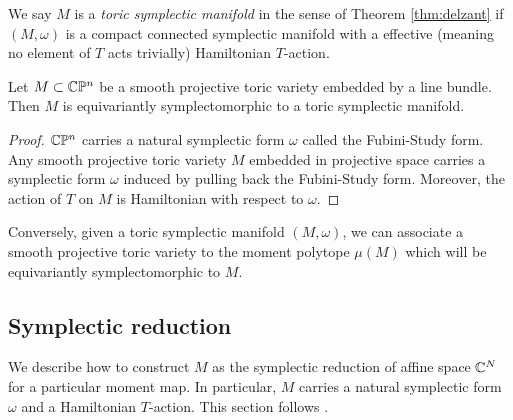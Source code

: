 We say $M$ is a \emph{toric symplectic manifold} in the sense of Theorem \ref{thm:delzant}
if $(M,\omega)$ is a compact connected symplectic manifold
with a effective (meaning no element of $T$ acts trivially) Hamiltonian $T$-action.

\begin{proposition}
    Let $M\subset \mathbb{C}\mathbb{P}^n$ be a smooth projective toric variety embedded by a line bundle.
    Then $M$ is equivariantly symplectomorphic to a toric symplectic manifold.
\end{proposition}
\begin{proof}
$\mathbb{C}\mathbb{P}^n$ carries a natural symplectic form $\omega$ 
called the Fubini-Study form. Any smooth projective toric variety $M$ embedded
in projective space carries a symplectic form $\omega$ induced by pulling 
back the Fubini-Study form. Moreover, the action of $T$ on $M$
 is Hamiltonian with respect to $\omega$.
\end{proof}

\hfill

Conversely, given a toric symplectic manifold $(M,\omega)$, we can associate a 
smooth projective toric variety to the moment polytope $\mu(M)$ which will be
equivariantly symplectomorphic to $M$.

\subsection{Symplectic reduction}
We describe how to construct $M$ as the symplectic reduction of affine space $\mathbb{C}^N$ for 
a particular moment map. In particular, $M$ carries a natural symplectic form $\omega$ and 
a Hamiltonian $T$-action.
This section follows \cite{lsg}. 

\hfill 

